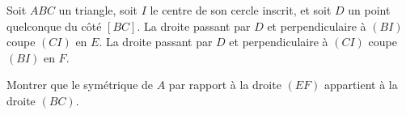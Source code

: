 Soit $ABC$ un triangle, soit $I$ le centre de son cercle inscrit, et soit $D$ un point quelconque du côté $[BC]$. La droite passant par $D$ et perpendiculaire à $(BI)$ coupe $(CI)$ en $E$. La droite passant par $D$ et perpendiculaire à $(CI)$ coupe $(BI)$ en $F$.

Montrer que le symétrique de $A$ par rapport à la droite $(EF)$ appartient à la droite $(BC)$.
